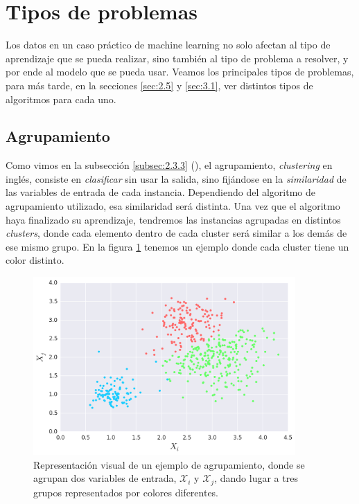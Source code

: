 \section{Tipos de problemas} \label{sec:2.4}

Los datos en un caso práctico de machine learning no solo afectan al tipo de aprendizaje que se pueda realizar, sino también al tipo de problema a resolver, y por ende al modelo que se pueda usar. Veamos los principales tipos de problemas, para más tarde, en la secciones \ref{sec:2.5} y \ref{sec:3.1}, ver distintos tipos de algoritmos para cada uno. 

\subsection{Agrupamiento} \label{subsec:2.4.1}

Como vimos en la subsección \ref{subsec:2.3.3} (\emph{}), el agrupamiento, \emph{clustering} en inglés, consiste en \emph{clasificar} sin usar la salida, sino fijándose en la \emph{similaridad} de las variables de entrada de cada instancia. Dependiendo del algoritmo de agrupamiento utilizado, esa similaridad será distinta. Una vez que el algoritmo haya finalizado su aprendizaje, tendremos las instancias agrupadas en distintos \emph{clusters}, donde cada elemento dentro de cada cluster será similar a los demás de ese mismo grupo. En la figura \ref{fig:2.2} tenemos un ejemplo donde cada cluster tiene un color distinto.

\begin{figure}[ht]
  \centering
  \includegraphics[width=100mm]{figures/ch_02/clustering_example.png}
  \caption{Representación visual de un ejemplo de agrupamiento, donde se agrupan dos variables de entrada, $\mathcal{X}_{i}$ y $\mathcal{X}_{j}$, dando lugar a tres grupos representados por colores diferentes.}
  \label{fig:2.2}
\end{figure}

